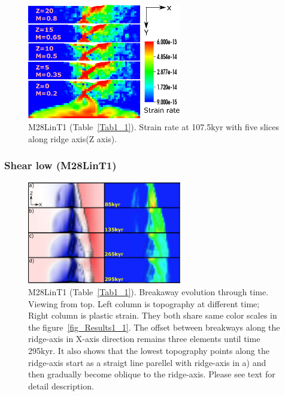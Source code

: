 \begin{figure}[h]
  \centering
    \includegraphics[width=0.6\textwidth]{./Figures/fig_Results1_2.eps}
  \caption{M28LinT1 (Table~\hyperref[Tab1_1]{\ref{Tab1_1}}). Strain rate at 107.5kyr with five slices along ridge axis(Z axis).}
 \label{fig_Results1_2}
\end{figure}   

\subsubsection{Shear low (M28LinT1)}

\begin{figure}[h]
  \centering
    \includegraphics[width=0.6\textwidth]{./Figures/fig_Results1_4.eps}
  \caption{M28LinT1 (Table~\hyperref[Tab1_1]{\ref{Tab1_1}}). Breakaway evolution through time. Viewing from top. Left column is topography at different time; Right column is plastic strain. They both share same color scales in the figure~\hyperref[fig_Results1_1]{\ref{fig_Results1_1}}. The offset between breakways along the ridge-axis in X-axis direction remains three elements until time 295kyr. It also shows that the lowest topography points along the ridge-axis start as a straigt line parellel with ridge-axis in a) and then gradually become oblique to the ridge-axis. Please see text for detail description.}
 \label{fig_Results1_4}
\end{figure}


